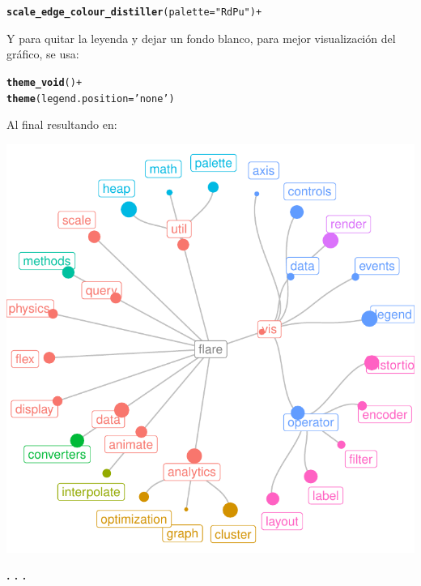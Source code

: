 \documentclass{article}\usepackage[]{graphicx}\usepackage[]{color}
\makeatletter
\def\maxwidth{ %
  \ifdim\Gin@nat@width>\linewidth
    \linewidth
  \else
    \Gin@nat@width
  \fi
}
\newcommand{\hlstr}[1]{\textcolor[rgb]{0.192,0.494,0.8}{#1}}%
\newcommand{\hlopt}[1]{\textcolor[rgb]{0,0,0}{#1}}%
\newcommand{\hlstd}[1]{\textcolor[rgb]{0.345,0.345,0.345}{#1}}%
\newcommand{\hlkwc}[1]{\textcolor[rgb]{0.333,0.667,0.333}{#1}}%
\newcommand{\hlkwd}[1]{\textcolor[rgb]{0.737,0.353,0.396}{\textbf{#1}}}%
\newenvironment{kframe}{%
 \def\at@end@of@kframe{}%
 \ifinner\ifhmode%
  \def\at@end@of@kframe{\end{minipage}}%
  \begin{minipage}{\columnwidth}%
 \fi\fi%
 \def\FrameCommand##1{\hskip\@totalleftmargin \hskip-\fboxsep
 \colorbox{shadecolor}{##1}\hskip-\fboxsep
     \hskip-\linewidth \hskip-\@totalleftmargin \hskip\columnwidth}%
 \MakeFramed {\advance\hsize-\width
   \@totalleftmargin\z@ \linewidth\hsize
   \@setminipage}}%
 {\par\unskip\endMakeFramed%
 \at@end@of@kframe}
\newenvironment{knitrout}{}{} %
\makeatother
\begin{document}
\begin{knitrout}
\color{fgcolor}\begin{kframe}
\begin{alltt}
  \hlkwd{scale_edge_colour_distiller}(palette = \hlstr{"RdPu"}) +
\end{alltt}
\end{kframe}
\end{knitrout}
Y para quitar la leyenda y dejar un fondo blanco, para mejor visualizaci\'on del gr\'afico, se usa:
\begin{knitrout}
\color{fgcolor}\begin{kframe}
\begin{alltt}
  \hlkwd{theme_void}\hlstd{()} \hlopt{+}
  \hlkwd{theme}\hlstd{(}\hlkwc{legend.position} \hlstd{=} \hlstr{'none'}\hlstd{)}
\end{alltt}
\end{kframe}
\end{knitrout}
\clearpage
Al final resultando en:
\begin{knitrout}
\color{fgcolor}

{\centering \includegraphics[width=\maxwidth]{figure/grafo_ggrpah-1} 

}



\end{knitrout}
\begin{center}
\textbf{. . .}
\end{center}
\end{document}
